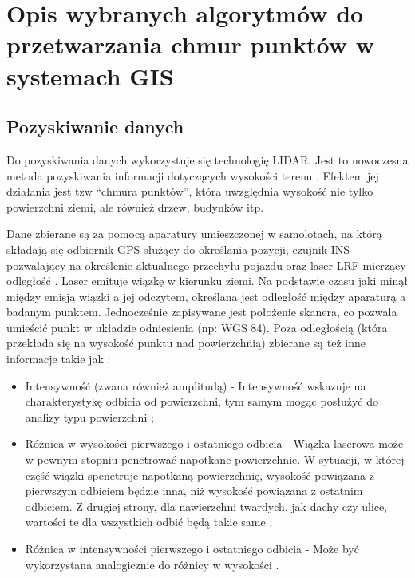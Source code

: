 \chapter{Opis wybranych algorytmów do przetwarzania chmur punktów w systemach GIS}

\section{Pozyskiwanie danych}
Do pozyskiwania danych wykorzystuje się technologię LIDAR. Jest to nowoczesna metoda pozyskiwania informacji dotyczących wysokości terenu \cite{Marmol2003}. Efektem jej działania jest tzw “chmura punktów”, która uwzględnia wysokość nie tylko powierzchni ziemi, ale również drzew, budynków itp.

Dane zbierane są za pomocą aparatury umieszczonej w samolotach, na którą składają się odbiornik GPS służący do określania pozycji, czujnik INS pozwalający na określenie aktualnego przechyłu pojazdu oraz laser
LRF mierzący odległość \cite{WBPW2012}. Laser emituje wiązkę w kierunku ziemi. Na podstawie czasu jaki minął między emisją wiązki a jej odczytem, określana jest odległość między aparaturą a badanym punktem.
Jednocześnie zapisywane jest położenie skanera, co pozwala umieścić punkt w układzie odniesienia (np: WGS 84). Poza odległością (która przekłada się na wysokość punktu nad powierzchnią) zbierane są też inne
informacje takie jak \cite{chen2014}:
\begin{itemize}
\item Intensywność (zwana również amplitudą) - Intensywność wskazuje na charakterystykę odbicia od powierzchni, tym samym mogąc posłużyć do analizy typu powierzchni \cite{yunfei2008};
\item Różnica w wysokości pierwszego i ostatniego odbicia - Wiązka laserowa może w pewnym stopniu penetrować napotkane powierzchnie. W sytuacji, w której część wiązki spenetruje napotkaną powierzchnię,
    wysokość powiązana z pierwszym odbiciem będzie inna, niż wysokość powiązana z ostatnim odbiciem. Z drugiej strony, dla nawierzchni twardych, jak dachy czy ulice, wartości te dla wszystkich odbić będą 
    takie same \cite{chen2014};
\item Różnica w intensywności pierwszego i ostatniego odbicia - Może być wykorzystana analogicznie do różnicy w wysokości \cite{chen2014}.
\end{itemize}

